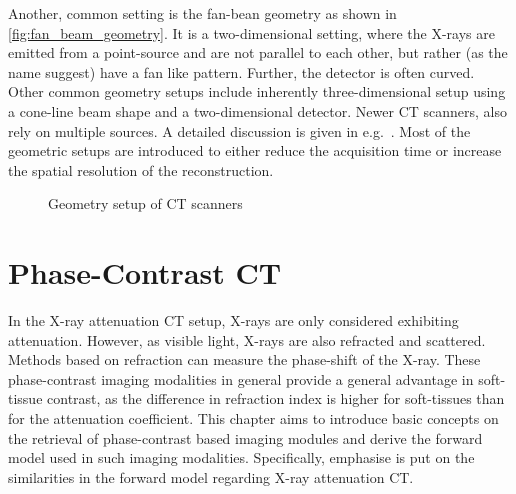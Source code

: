 Another, common setting is the fan-bean geometry as shown in \autoref{fig:fan_beam_geometry}. It is
a two-dimensional setting, where the X-rays are emitted from a point-source and are not parallel to
each other, but rather (as the name suggest) have a fan like pattern. Further, the detector is often
curved. Other common geometry setups include inherently three-dimensional setup using a cone-line
beam shape and a two-dimensional detector. Newer CT scanners, also rely on multiple sources. A
detailed discussion is given in e.g.\ \cite{buzug_computed_2008}. Most of the geometric setups are
introduced to either reduce the acquisition time or increase the spatial resolution of the
reconstruction.

\begin{figure}
	\centering
	\caption{Geometry setup of CT scanners}\label{fig:ct_geometry_setup}
\end{figure}

\section{Phase-Contrast CT}\label{sec:phasecontrast_ct}

In the X-ray attenuation CT setup, X-rays are only considered exhibiting attenuation. However, as
visible light, X-rays are also refracted and scattered. Methods based on refraction can measure the
phase-shift of the X-ray. These phase-contrast imaging modalities in general provide a general
advantage in soft-tissue contrast, as the difference in refraction index is higher for soft-tissues
than for the attenuation coefficient. This chapter aims to introduce basic concepts on the retrieval
of phase-contrast based imaging modules and derive the forward model used in such imaging
modalities. Specifically, emphasise is put on the similarities in the forward model regarding X-ray
attenuation CT\@.

